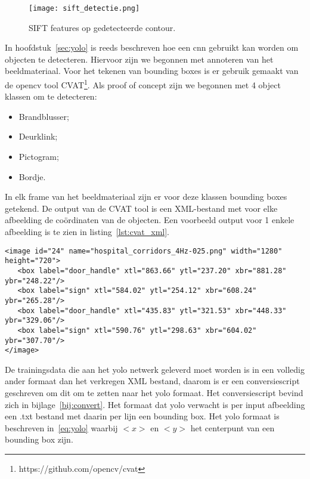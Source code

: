    \begin{figure}[!htb]
      \centering
      \texttt{[image: sift\_detectie.png]}
      \caption{SIFT features op gedetecteerde contour.}
      \label{fig:sift_detect}
   \end{figure}


   In hoofdstuk~\ref{sec:yolo} is reeds beschreven hoe een \gls{cnn} gebruikt kan worden om objecten te detecteren. Hiervoor zijn we begonnen met annoteren van het beeldmateriaal.
   Voor het tekenen van bounding boxes is er gebruik gemaakt van de opencv tool CVAT\footnote{https://github.com/opencv/cvat}. Als proof of concept zijn we begonnen met 4 object klassen om te detecteren:

   \begin{itemize}
      \item Brandblusser;
      \item Deurklink;
      \item Pictogram;
      \item Bordje.
   \end{itemize}

   In elk frame van het beeldmateriaal zijn er voor deze klassen bounding boxes getekend. De output van de CVAT tool is een XML-bestand met voor elke afbeelding de co\"{o}rdinaten van de objecten.
   Een voorbeeld output voor 1 enkele afbeelding is te zien in listing~\ref{lst:cvat_xml}.

   \begin{lstlisting}
<image id="24" name="hospital_corridors_4Hz-025.png" width="1280" height="720">
   <box label="door_handle" xtl="863.66" ytl="237.20" xbr="881.28" ybr="248.22"/>
   <box label="sign" xtl="584.02" ytl="254.12" xbr="608.24" ybr="265.28"/>
   <box label="door_handle" xtl="435.83" ytl="321.53" xbr="448.33" ybr="329.06"/>
   <box label="sign" xtl="590.76" ytl="298.63" xbr="604.02" ybr="307.70"/>
</image>     
   \end{lstlisting}

   De trainingsdata die aan het \gls{yolo} netwerk geleverd moet worden is in een volledig ander formaat dan het verkregen XML bestand, daarom is er een conversiescript geschreven om dit om te zetten naar het \gls{yolo} formaat.
   Het conversiescript bevind zich in bijlage~\ref{bij:convert}. 
   Het formaat dat \gls{yolo} verwacht is per input afbeelding een .txt bestand met daarin per lijn een bounding box. Het \gls{yolo} formaat is beschreven in~\ref{eq:yolo} waarbij $<x>$ en $<y>$ het centerpunt van een bounding box zijn.

